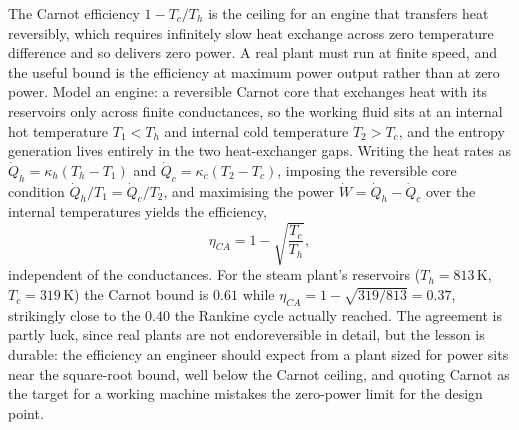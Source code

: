 \begin{mastery}
The Carnot efficiency $1 - T_c/T_h$ is the ceiling for an engine that transfers
heat reversibly, which requires infinitely slow heat exchange across zero
temperature difference and so delivers zero power. A real plant must run at finite
speed, and the useful bound is the efficiency at maximum power output rather than
at zero power. Model an  engine: a reversible Carnot core
that exchanges heat with its reservoirs only across finite conductances, so the
working fluid sits at an internal hot temperature $T_1 < T_h$ and internal cold
temperature $T_2 > T_c$, and the entropy generation lives entirely in the two
heat-exchanger gaps. Writing the heat rates as $\dot Q_h = \kappa_h(T_h - T_1)$
and $\dot Q_c = \kappa_c(T_2 - T_c)$, imposing the reversible core condition
$\dot Q_h/T_1 = \dot Q_c/T_2$, and maximising the power $\dot W = \dot Q_h -
\dot Q_c$ over the internal temperatures yields the 
efficiency,
\[
\eta_{CA} = 1 - \sqrt{\frac{T_c}{T_h}},
\]
independent of the conductances. For the steam plant's reservoirs
($T_h = 813\,\si{\kelvin}$, $T_c = 319\,\si{\kelvin}$) the Carnot bound is
$0.61$ while $\eta_{CA} = 1 - \sqrt{319/813} = 0.37$, strikingly close to the
$0.40$ the Rankine cycle actually reached. The agreement is partly luck, since
real plants are not endoreversible in detail, but the lesson is durable: the
efficiency an engineer should expect from a plant sized for power sits near the
square-root bound, well below the Carnot ceiling, and quoting Carnot as the target
for a working machine mistakes the zero-power limit for the design point.
\end{mastery}

